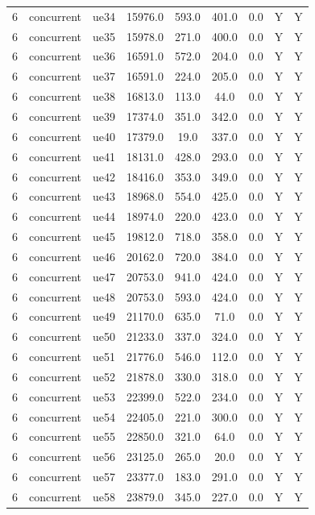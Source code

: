 \begin{table}[ht]
\begin{tabular}{|c|c|c|c|c|c|c|c|c|}
6 & concurrent & ue34 & 15976.0 & 593.0 & 401.0 & 0.0 & Y & Y \\
6 & concurrent & ue35 & 15978.0 & 271.0 & 400.0 & 0.0 & Y & Y \\
6 & concurrent & ue36 & 16591.0 & 572.0 & 204.0 & 0.0 & Y & Y \\
6 & concurrent & ue37 & 16591.0 & 224.0 & 205.0 & 0.0 & Y & Y \\
6 & concurrent & ue38 & 16813.0 & 113.0 & 44.0 & 0.0 & Y & Y \\
6 & concurrent & ue39 & 17374.0 & 351.0 & 342.0 & 0.0 & Y & Y \\
6 & concurrent & ue40 & 17379.0 & 19.0 & 337.0 & 0.0 & Y & Y \\
6 & concurrent & ue41 & 18131.0 & 428.0 & 293.0 & 0.0 & Y & Y \\
6 & concurrent & ue42 & 18416.0 & 353.0 & 349.0 & 0.0 & Y & Y \\
6 & concurrent & ue43 & 18968.0 & 554.0 & 425.0 & 0.0 & Y & Y \\
6 & concurrent & ue44 & 18974.0 & 220.0 & 423.0 & 0.0 & Y & Y \\
6 & concurrent & ue45 & 19812.0 & 718.0 & 358.0 & 0.0 & Y & Y \\
6 & concurrent & ue46 & 20162.0 & 720.0 & 384.0 & 0.0 & Y & Y \\
6 & concurrent & ue47 & 20753.0 & 941.0 & 424.0 & 0.0 & Y & Y \\
6 & concurrent & ue48 & 20753.0 & 593.0 & 424.0 & 0.0 & Y & Y \\
6 & concurrent & ue49 & 21170.0 & 635.0 & 71.0 & 0.0 & Y & Y \\
6 & concurrent & ue50 & 21233.0 & 337.0 & 324.0 & 0.0 & Y & Y \\
6 & concurrent & ue51 & 21776.0 & 546.0 & 112.0 & 0.0 & Y & Y \\
6 & concurrent & ue52 & 21878.0 & 330.0 & 318.0 & 0.0 & Y & Y \\
6 & concurrent & ue53 & 22399.0 & 522.0 & 234.0 & 0.0 & Y & Y \\
6 & concurrent & ue54 & 22405.0 & 221.0 & 300.0 & 0.0 & Y & Y \\
6 & concurrent & ue55 & 22850.0 & 321.0 & 64.0 & 0.0 & Y & Y \\
6 & concurrent & ue56 & 23125.0 & 265.0 & 20.0 & 0.0 & Y & Y \\
6 & concurrent & ue57 & 23377.0 & 183.0 & 291.0 & 0.0 & Y & Y \\
6 & concurrent & ue58 & 23879.0 & 345.0 & 227.0 & 0.0 & Y & Y \\

\end{tabular}
\end{table}
